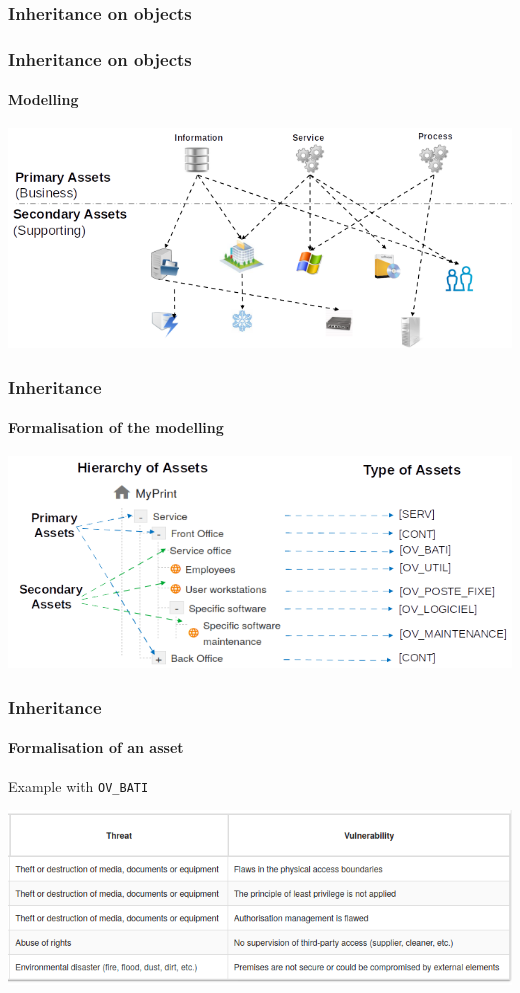 \subsubsection{Inheritance on objects}
\begin{frame}
  \frametitle{Inheritance on objects}
  \framesubtitle{Modelling}
  \begin{center}
    \includegraphics[scale=0.45]{../common_pictures/MONARC-method-modelling.png}
  \end{center}
\end{frame}

\begin{frame}
  \frametitle{Inheritance}
  \framesubtitle{Formalisation of the modelling}
  \begin{center}
    \includegraphics[scale=0.5]{../common_pictures/MONARC-modelling-formalisation.png}
  \end{center}
\end{frame}

\begin{frame}
  \frametitle{Inheritance}
  \framesubtitle{Formalisation of an asset}
  Example with \texttt{OV\_BATI}
  \begin{center}
    \includegraphics[scale=0.7]{../common_pictures/ov_bati.png}
  \end{center}
\end{frame}

